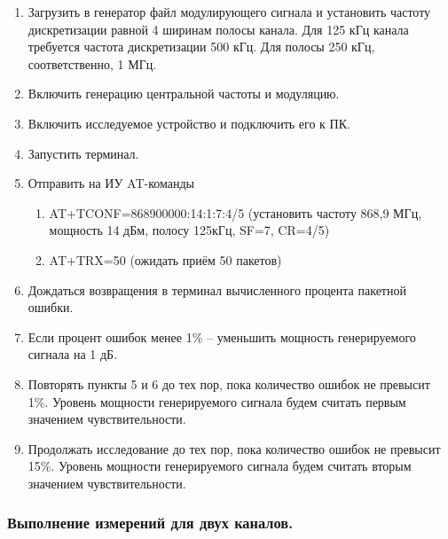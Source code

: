 \begin{enumerate}
	\setlength\itemsep{-1ex}
	\item Загрузить в генератор файл модулирующего сигнала и установить частоту дискретизации равной 4 ширинам полосы канала. Для 125 кГц канала требуется частота дискретизации 500 кГц. Для полосы 250 кГц, соответственно, 1 МГц.
	\item Включить генерацию центральной частоты и модуляцию.
	\item Включить исследуемое устройство и подключить его к ПК.
	\item Запустить терминал. 
	\item Отправить на ИУ AT-команды
	\begin{enumerate}
		\setlength\itemsep{-1ex}
		\item AT+TCONF=868900000:14:1:7:4/5 (установить частоту 868,9 МГц, мощность 14 дБм, полосу 125кГц, SF=7, CR=4/5)
		\item AT+TRX=50 (ожидать приём 50 пакетов)
	\end{enumerate}
	\item Дождаться возвращения в терминал вычисленного процента пакетной ошибки. 
	\item Если процент ошибок менее 1\% – уменьшить мощность генерируемого сигнала на 1 дБ.
	\item Повторять пункты 5 и 6 до тех пор, пока количество ошибок не превысит 1\%. Уровень мощности генерируемого сигнала будем считать первым значением чувствительности. 
	\item Продолжать исследование до тех пор, пока количество ошибок не превысит 15\%. Уровень мощности генерируемого сигнала будем считать вторым значением чувствительности. 
	
\end{enumerate}

\subsubsection{Выполнение измерений для двух каналов.}

